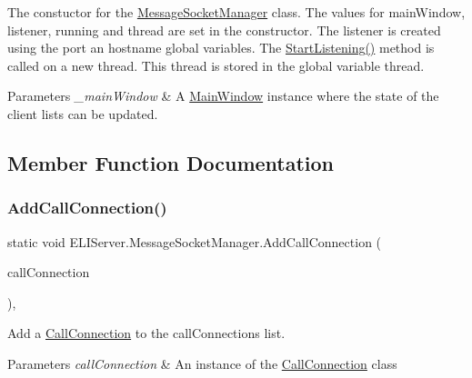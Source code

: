 The constuctor for the \hyperlink{class_e_l_i_server_1_1_message_socket_manager}{Message\+Socket\+Manager} class. The values for main\+Window, listener, running and thread are set in the constructor. The listener is created using the port an hostname global variables. The \hyperlink{class_e_l_i_server_1_1_message_socket_manager_ab5d2f61a349046960ae63303ff1c2130}{Start\+Listening()} method is called on a new thread. This thread is stored in the global variable thread. 


\begin{DoxyParams}{Parameters}
{\em \+\_\+main\+Window} & A \hyperlink{class_e_l_i_server_1_1_main_window}{Main\+Window} instance where the state of the client lists can be updated.\\
\hline
\end{DoxyParams}


\subsection{Member Function Documentation}
\mbox{\label{class_e_l_i_server_1_1_message_socket_manager_acf805bfb3292019f77e637135009ee78}} 
\subsubsection{\texorpdfstring{Add\+Call\+Connection()}{AddCallConnection()}}
{\footnotesize\ttfamily static void E\+L\+I\+Server.\+Message\+Socket\+Manager.\+Add\+Call\+Connection (\begin{DoxyParamCaption}\item[{\hyperlink{class_e_l_i_server_1_1_call_connection}{Call\+Connection}}]{call\+Connection }\end{DoxyParamCaption})\hspace{0.3cm}{\ttfamily [inline]}, {\ttfamily [static]}}



Add a \hyperlink{class_e_l_i_server_1_1_call_connection}{Call\+Connection} to the call\+Connections list. 


\begin{DoxyParams}{Parameters}
{\em call\+Connection} & An instance of the \hyperlink{class_e_l_i_server_1_1_call_connection}{Call\+Connection} class\\
\hline
\end{DoxyParams}
\mbox{\label{class_e_l_i_server_1_1_message_socket_manager_ac2dffa438503f596446e4a0137582962}} 
